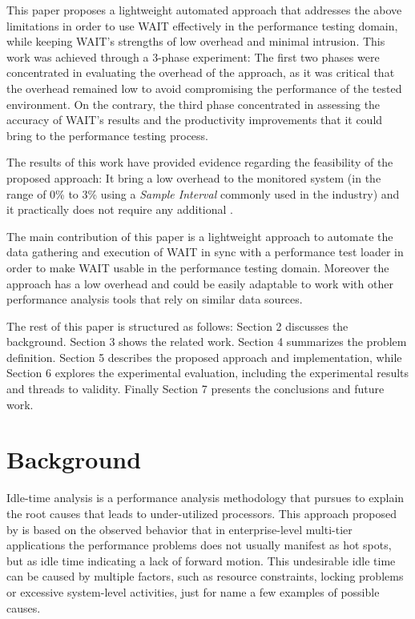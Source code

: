 \documentclass[runningheads,a4paper]{llncs}
\begin{document}
This paper proposes a lightweight automated approach that addresses the above
limitations in order to use WAIT effectively in the performance testing domain, 
while keeping WAIT's strengths of low overhead and minimal intrusion. This work
was achieved through a 3-phase experiment: The first two phases were concentrated 
in evaluating the overhead of the approach, as it was critical that the overhead remained low to avoid
compromising the performance of the tested environment. On the contrary, the third 
phase concentrated in assessing the accuracy of WAIT's results and the productivity 
improvements that it could bring to the performance testing process. 

The results of this work have provided evidence regarding the feasibility of the
proposed approach: It bring a low overhead to the monitored system (in the range
of 0\% to 3\% using a \emph{Sample Interval} commonly used in the industry) and
it practically does not require any additional .

The main contribution of this paper is a lightweight approach to automate the data 
gathering and execution of WAIT in sync with a performance test loader in
order to make WAIT usable in the performance testing domain. Moreover the
approach has a low overhead and could be easily adaptable to work with other
performance analysis tools that rely on similar data sources.

The rest of this paper is structured as follows: Section 2 discusses the
background. Section 3 shows the related work. Section 4 summarizes the
problem definition. Section 5 describes the proposed approach and
implementation, while Section 6 explores the experimental evaluation, including
the experimental results and threads to validity. Finally Section 7 presents the
conclusions and future work.


\section{Background}

Idle-time analysis is a performance analysis methodology that pursues to explain
the root causes that leads to under-utilized processors. This approach
proposed by \cite{Altman2010} is based on the observed behavior that in 
enterprise-level multi-tier applications the performance problems does not
usually manifest as hot spots, but as idle time indicating a lack of
forward motion. This undesirable idle time can be caused by multiple
factors, such as resource constraints, locking problems or excessive
system-level activities, just for name a few examples of possible causes.
\end{document}
